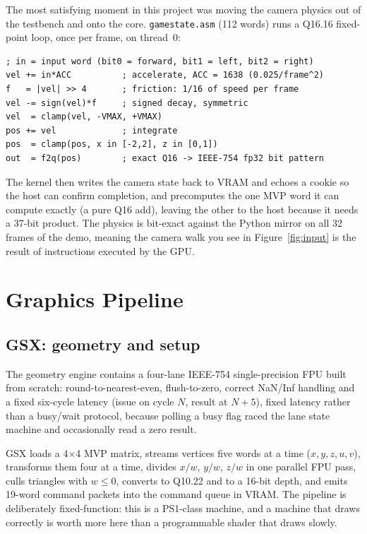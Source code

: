 \documentclass[conference]{IEEEtran}
\begin{document}
The most satisfying moment in this project was moving the camera physics out of
the testbench and onto the core. \texttt{gamestate.asm} (112 words) runs a
Q16.16 fixed-point loop, once per frame, on thread~0:

\begin{lstlisting}
; in = input word (bit0 = forward, bit1 = left, bit2 = right)
vel += in*ACC          ; accelerate, ACC = 1638 (0.025/frame^2)
f   = |vel| >> 4       ; friction: 1/16 of speed per frame
vel -= sign(vel)*f     ; signed decay, symmetric
vel  = clamp(vel, -VMAX, +VMAX)
pos += vel             ; integrate
pos  = clamp(pos, x in [-2,2], z in [0,1])
out  = f2q(pos)        ; exact Q16 -> IEEE-754 fp32 bit pattern
\end{lstlisting}

The kernel then writes the camera state back to VRAM and echoes a cookie so the
host can confirm completion, and precomputes the one MVP word it can compute
exactly (a pure Q16 add), leaving the other to the host because it needs a
37-bit product. The physics is bit-exact against the Python mirror on all 32
frames of the demo, meaning the camera walk you see in
Figure~\ref{fig:input} is the result of instructions executed by the GPU.

\section{Graphics Pipeline}
\label{sec:gfx}

\subsection{GSX: geometry and setup}

The geometry engine contains a four-lane IEEE-754 single-precision FPU built
from scratch: round-to-nearest-even, flush-to-zero, correct NaN/Inf handling and
a fixed six-cycle latency (issue on cycle $N$, result at $N+5$), fixed
latency rather than a busy/wait protocol, because polling a busy flag raced the
lane state machine and occasionally read a zero result.

GSX loads a 4$\times$4 MVP matrix, streams vertices five words at a time
($x,y,z,u,v$), transforms them four at a time, divides $x/w$, $y/w$, $z/w$ in
one parallel FPU pass, culls triangles with $w \le 0$, converts to Q10.22 and to
a 16-bit depth, and emits 19-word command packets into the command queue in
VRAM. The pipeline is deliberately fixed-function: this is a PS1-class machine,
and a machine that draws correctly is worth more here
than a programmable shader that draws slowly.
\end{document}
